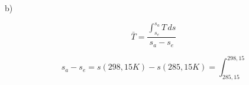 b)

\[
\bar{T} = \frac{\int_{s_e}^{s_a} T \, ds}{s_a - s_e}
\]

\[
s_a - s_e = s(298,15 K) - s(285,15 K) = \int_{285,15}^{298,15}
\]